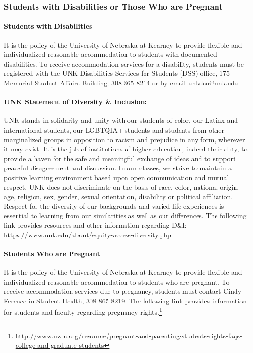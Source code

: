 \documentclass[12pt,fullpage]{article}
\newcounter{ex}\setcounter{ex}{0}
\begin{document}
\subsubsection*{Students with Disabilities or Those Who are Pregnant}

\paragraph{Students with Disabilities} It is the policy of the University of Nebraska at Kearney to provide flexible and individualized reasonable accommodation to students with documented disabilities. To receive accommodation services for a disability, students must be registered with the UNK Disabilities Services for Students (DSS) office, 175 Memorial Student Affairs Building, 308-865-8214 or by email unkdso@unk.edu

\paragraph{UNK Statement of Diversity \& Inclusion:} UNK stands in solidarity and unity with our students of color, our Latinx and international students, our LGBTQIA+ students and students from other marginalized groups in opposition to racism and prejudice in any form, wherever it may exist. It is the job of institutions of higher education, indeed their duty, to provide a haven for the safe and meaningful exchange of ideas and to support peaceful disagreement and discussion. In our classes, we strive to maintain a positive learning environment based upon open communication and mutual respect. UNK does not discriminate on the basis of race, color, national origin, age, religion, sex, gender, sexual orientation, disability or political affiliation. Respect for the diversity of our backgrounds and varied 
life experiences is essential to learning from our similarities as well as our differences. The following link provides resources and other information regarding D\&I: 
\url{https://www.unk.edu/about/equity-access-diversity.php}

\paragraph{Students Who are Pregnant} It is the policy of the University of Nebraska at Kearney to provide flexible and individualized reasonable accommodation to students who are pregnant. To receive accommodation services due to pregnancy, students must contact Cindy Ference in Student Health, 308-865-8219. The following link provides information for students and faculty regarding pregnancy rights.\footnote{\tiny  \url{http://www.nwlc.org/resource/pregnant-and-parenting-students-rights-faqs-college-and-graduate-students}}
\end{document}
